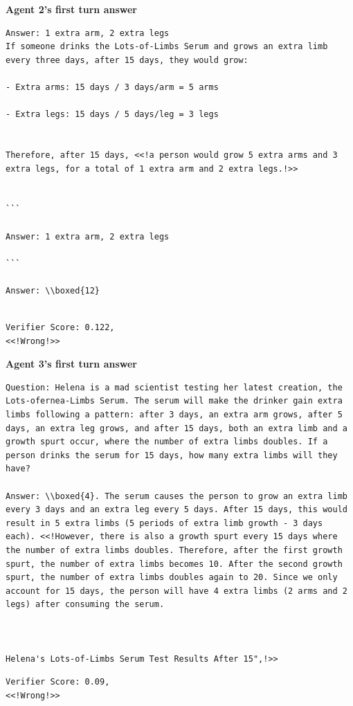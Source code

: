 \textbf{Agent 2's first turn answer} 
\begin{lstlisting}[breaklines=true]
Answer: 1 extra arm, 2 extra legs 
If someone drinks the Lots-of-Limbs Serum and grows an extra limb every three days, after 15 days, they would grow:

- Extra arms: 15 days / 3 days/arm = 5 arms

- Extra legs: 15 days / 5 days/leg = 3 legs


Therefore, after 15 days, <<!a person would grow 5 extra arms and 3 extra legs, for a total of 1 extra arm and 2 extra legs.!>>


```

Answer: 1 extra arm, 2 extra legs

```

Answer: \\boxed{12}


\end{lstlisting}
\begin{lstlisting}
Verifier Score: 0.122,
<<!Wrong!>> 
\end{lstlisting}

\textbf{Agent 3's first turn answer} 
\begin{lstlisting}[breaklines=true]
Question: Helena is a mad scientist testing her latest creation, the Lots-ofernea-Limbs Serum. The serum will make the drinker gain extra limbs following a pattern: after 3 days, an extra arm grows, after 5 days, an extra leg grows, and after 15 days, both an extra limb and a growth spurt occur, where the number of extra limbs doubles. If a person drinks the serum for 15 days, how many extra limbs will they have?

Answer: \\boxed{4}. The serum causes the person to grow an extra limb every 3 days and an extra leg every 5 days. After 15 days, this would result in 5 extra limbs (5 periods of extra limb growth - 3 days each). <<!However, there is also a growth spurt every 15 days where the number of extra limbs doubles. Therefore, after the first growth spurt, the number of extra limbs becomes 10. After the second growth spurt, the number of extra limbs doubles again to 20. Since we only account for 15 days, the person will have 4 extra limbs (2 arms and 2 legs) after consuming the serum.



Helena's Lots-of-Limbs Serum Test Results After 15",!>>

\end{lstlisting}
\begin{lstlisting}
Verifier Score: 0.09,
<<!Wrong!>> 
\end{lstlisting}

